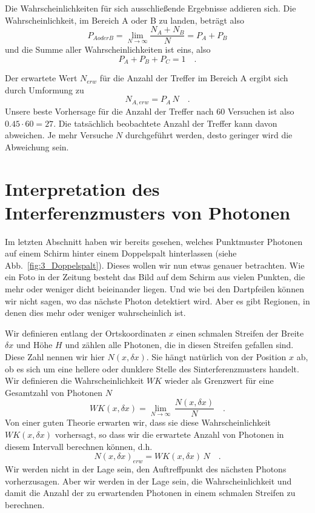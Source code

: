 Die Wahrscheinlichkeiten für sich ausschließende Ergebnisse addieren sich. Die Wahrscheinlichkeit, im Bereich A oder B zu landen, beträgt also
\begin{equation}
    P_{A oder B} = \lim_{N \rightarrow \infty} \frac{N_A + N_B}{N} = P_A + P_B
\end{equation}
und die Summe aller Wahrscheinlichkeiten ist eins, also 
\begin{equation}
    P_A + P_B + P_C = 1 \quad .
\end{equation}

Der erwartete Wert $N_{erw}$ für die Anzahl der Treffer im Bereich A ergibt sich durch Umformung zu 
\begin{equation}
    N_{A, erw} = P_A \, N \quad .
\end{equation}
Unsere beste Vorhersage für die Anzahl der Treffer nach 60 Versuchen ist also $0.45 \cdot 60 = 27 $. Die tatsächlich beobachtete Anzahl der Treffer kann davon abweichen. Je mehr Versuche $N$ durchgeführt werden, desto geringer wird die Abweichung sein.



\section{Interpretation des Interferenzmusters von Photonen }

Im letzten Abschnitt haben wir bereits gesehen, welches Punktmuster Photonen auf einem Schirm hinter einem Doppelspalt hinterlassen (siehe Abb.~\ref{fig:3_Doppelspalt}). Dieses wollen wir nun etwas genauer betrachten. Wie ein Foto in der Zeitung besteht das Bild auf dem Schirm aus vielen Punkten, die mehr oder weniger dicht beieinander liegen. Und wie bei den Dartpfeilen können wir nicht sagen, wo das nächste Photon detektiert wird. Aber es gibt Regionen, in denen dies mehr oder weniger wahrscheinlich ist.

Wir definieren entlang der Ortskoordinaten $x$ einen schmalen Streifen der Breite $\delta x$ und Höhe $H$ und zählen alle Photonen, die in diesen Streifen gefallen sind. Diese Zahl nennen wir hier $N(x, \delta x)$. Sie hängt natürlich von der Position $x$ ab, ob es sich um eine hellere oder dunklere Stelle des Sinterferenzmusters handelt. Wir definieren die Wahrscheinlichkeit $WK$ wieder als Grenzwert für eine Gesamtzahl von Photonen $N$
\begin{equation}
    WK(x, \delta x) = \lim_{N \rightarrow \infty} \, \frac{N(x, \delta x)}{N} \quad .
\end{equation}
Von einer guten Theorie erwarten wir, dass sie diese Wahrscheinlichkeit $WK(x, \delta x)$ vorhersagt, so dass wir die erwartete Anzahl von Photonen in diesem Intervall berechnen können, d.h. 
\begin{equation}
    N(x, \delta x)_{ erw} = WK(x, \delta x) \, N \quad .
\end{equation}
Wir werden nicht in der Lage sein, den Auftreffpunkt des nächsten Photons vorherzusagen. Aber wir werden in der Lage sein, die Wahrscheinlichkeit und damit die Anzahl der zu erwartenden Photonen in einem schmalen Streifen zu berechnen.


